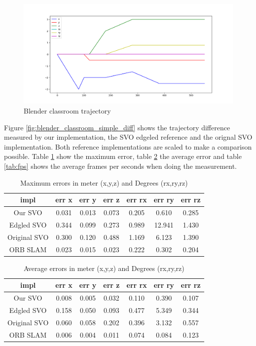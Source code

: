 \documentclass[11pt,a4paper,titlepage,oneside]{report}
\begin{document}
\begin{figure}[H]
  \includegraphics[width=1.0\textwidth]{img/blender_classroom_simple_traj.png}
  \caption{Blender classroom trajectory}\label{fig:blender_classroom_simple_traj}
\end{figure}

Figure \ref{fig:blender_classroom_simple_diff} shows the trajectory difference measured by our implementation, the SVO edgeled reference and the orignal SVO implementation. Both reference implementations are scaled to make a comparison possible. Table \ref{tab:maximas} show the maximum error, table \ref{tab:average} the average error and table \ref{tab:fps} shows the average frames per seconds when doing the measurement.

\begin{table}[H]
  \centering
  \begin{tabular}{|c|c|c|c|c|c|c|}
    impl & err x & err y & err z & err rx & err ry & err rz\\
    \hline
    Our SVO & 0.031 & 0.013 & 0.073 & 0.205 & 0.610 & 0.285\\
    Edgled SVO & 0.344 & 0.099 & 0.273 & 0.989 & 12.941 & 1.430\\
    Original SVO & 0.300 & 0.120 & 0.488 & 1.169 & 6.123 & 1.390\\
    ORB SLAM& 0.023 & 0.015 & 0.023 & 0.222 & 0.302 & 0.204
  \end{tabular}
  \caption{Maximum errors in meter (x,y,z) and Degrees (rx,ry,rz)}
  \label{tab:maximas}
\end{table}

\begin{table}[H]
  \centering
  \begin{tabular}{|c|c|c|c|c|c|c|}
  impl & err x & err y & err z & err rx & err ry & err rz\\
  \hline
  Our SVO & 0.008 & 0.005 & 0.032 & 0.110 & 0.390 & 0.107\\
  Edgled SVO & 0.158 & 0.050 & 0.093 & 0.477 & 5.349 & 0.344\\
  Original SVO & 0.060 & 0.058 & 0.202 & 0.396 & 3.132 & 0.557\\
  ORB SLAM & 0.006 & 0.004 & 0.011 & 0.074 & 0.084 & 0.123
\end{tabular}

\caption{Average errors in meter (x,y,z) and Degrees (rx,ry,rz)}
\label{tab:average}
\end{table}
\end{document}
